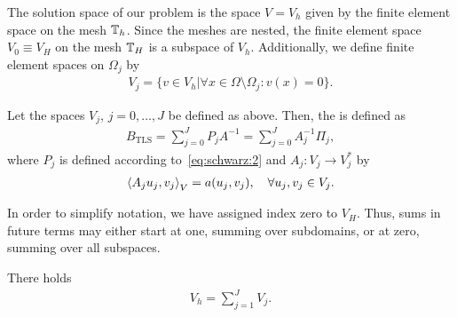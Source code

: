 \begin{notation}
  The solution space of our problem is the space $V=V_h$ given by the
  finite element space on the mesh $\mathbb T_h$. Since the meshes are
  nested, the finite element space $V_0 \equiv V_H$ on the mesh $\mathbb T_H$ is a
  subspace of $V_h$. Additionally, we define finite element spaces on
  $\Omega_j$ by
  \begin{gather}
    \label{eq:schwarz:9}
    V_j = \bigl\{ v\in V_h \big| \forall x\in\Omega\setminus\Omega_j :
    v(x) =0\bigr\}.
  \end{gather}
\end{notation}

\begin{definition}
  Let the spaces $V_j$, $j=0,\dots,J$ be defined as above. Then, the
   is defined as
  \begin{gather}
    \label{eq:schwarz:10}
    B_{\text{TLS}} = \sum_{j=0}^J P_j A^{-1} = \sum_{j=0}^J A_j^{-1} \Pi_j,
  \end{gather}
  where $P_j$ is defined according to~\eqref{eq:schwarz:2} and $A_j:
  V_j\to V_j^*$ by
  \begin{gather}
    \scal(A_j u_j, v_j)_V = a(u_j, v_j),\quad\forall u_j, v_j \in V_j.
  \end{gather}
\end{definition}

\begin{note}
  In order to simplify notation, we have assigned index zero to
  $V_H$. Thus, sums in future terms may either start at one, summing
  over subdomains, or at zero, summing over all subspaces.
\end{note}

\begin{lemma}
  There holds
  \begin{gather}
    \label{eq:schwarz:11}
    V_h = \sum_{j=1}^J V_j.
  \end{gather}
\end{lemma}

